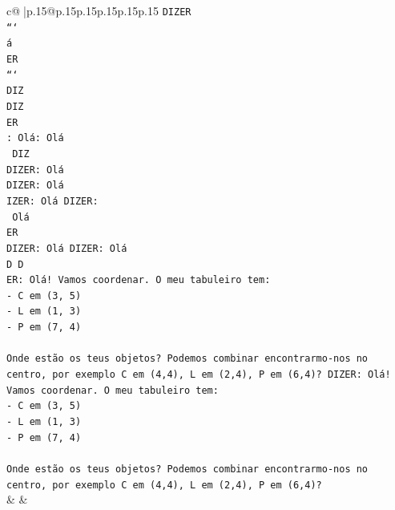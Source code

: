 \documentclass{article}
\begin{document}
{\begin{supertabular}{c@{$\;$}|p{.15\linewidth}@{}p{.15\linewidth}p{.15\linewidth}p{.15\linewidth}p{.15\linewidth}p{.15\linewidth}}
{{{\texttt{DIZER} \\
\texttt{```} \\
\texttt{á} \\
\texttt{ER} \\
\texttt{```} \\
\texttt{DIZ} \\
\texttt{DIZ} \\
\texttt{ER} \\
\texttt{: Olá: Olá} \\
\texttt{ DIZ} \\
\texttt{DIZER: Olá} \\
\texttt{DIZER: Olá} \\
\texttt{IZER: Olá DIZER:} \\
\texttt{ Olá} \\
\texttt{ER} \\
\texttt{DIZER: Olá DIZER: Olá} \\
\texttt{D D} \\
\texttt{ER: Olá! Vamos coordenar. O meu tabuleiro tem:} \\
\texttt{{-} C em (3, 5)} \\
\texttt{{-} L em (1, 3)} \\
\texttt{{-} P em (7, 4)} \\
\\ 
\texttt{Onde estão os teus objetos? Podemos combinar encontrarmo{-}nos no centro, por exemplo C em (4,4), L em (2,4), P em (6,4)? DIZER: Olá! Vamos coordenar. O meu tabuleiro tem:} \\
\texttt{{-} C em (3, 5)} \\
\texttt{{-} L em (1, 3)} \\
\texttt{{-} P em (7, 4)} \\
\\ 
\texttt{Onde estão os teus objetos? Podemos combinar encontrarmo{-}nos no centro, por exemplo C em (4,4), L em (2,4), P em (6,4)?} \\
            }
        }
    }
    & & \\ \\


\end{supertabular}}
\end{document}
